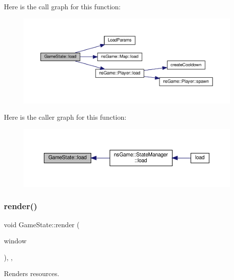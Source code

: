 Here is the call graph for this function\+:\nopagebreak
\begin{figure}[H]
\begin{center}
\leavevmode
\includegraphics[width=350pt]{class_game_state_ab89118f53bfc362e67e061539f3181da_cgraph}
\end{center}
\end{figure}
Here is the caller graph for this function\+:\nopagebreak
\begin{figure}[H]
\begin{center}
\leavevmode
\includegraphics[width=350pt]{class_game_state_ab89118f53bfc362e67e061539f3181da_icgraph}
\end{center}
\end{figure}
\mbox{\label{class_game_state_aa3665a5b951ec00ead47902e4c8df627}} 
\subsubsection{\texorpdfstring{render()}{render()}}
{\footnotesize\ttfamily void Game\+State\+::render (\begin{DoxyParamCaption}\item[{Min\+GL \&}]{window }\end{DoxyParamCaption})\hspace{0.3cm}{\ttfamily [inline]}, {\ttfamily [override]}, {\ttfamily [virtual]}}



Renders resources. 



